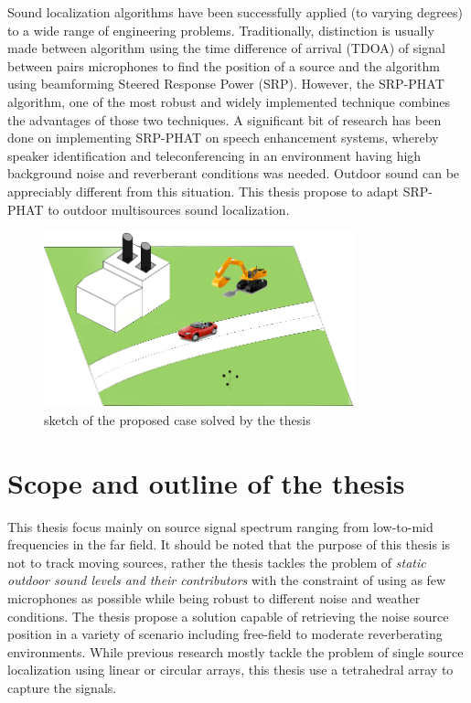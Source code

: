 Sound localization algorithms have been successfully applied (to varying degrees) to a wide range of engineering problems. Traditionally, distinction is usually made between algorithm using the time difference of arrival (TDOA) of signal between pairs microphones to find the position of a source and the algorithm using beamforming Steered Response Power (SRP). However, the SRP-PHAT algorithm, one of the most robust and widely implemented technique combines the advantages of those two techniques. A significant bit of research has been done on implementing SRP-PHAT on speech enhancement systems, whereby speaker identification and teleconferencing in an environment having high background noise and reverberant conditions was needed. Outdoor sound can be appreciably different from this situation. This thesis propose to adapt SRP-PHAT to outdoor multisources sound localization. 

\begin{figure}[H]
    \centering
    \includegraphics[width=0.8\textwidth]{Figures/scenario33.png}
    \caption{sketch of the proposed case solved by the thesis}
    \label{fig:Introductioncase}
\end{figure}

\section{Scope and outline of the thesis}

This thesis focus mainly on source signal spectrum ranging from low-to-mid frequencies in the far field. It should be noted that the purpose of this thesis is not to track moving sources, rather the thesis tackles the problem of \textit{static outdoor sound levels and their contributors} with the constraint of using as few microphones as possible while being robust to different noise and weather conditions. The thesis propose a solution capable of retrieving the noise source position in a variety of scenario including free-field to moderate reverberating environments. While previous research mostly tackle the problem of single source localization using linear or circular arrays, this thesis use a tetrahedral array to capture the signals.

